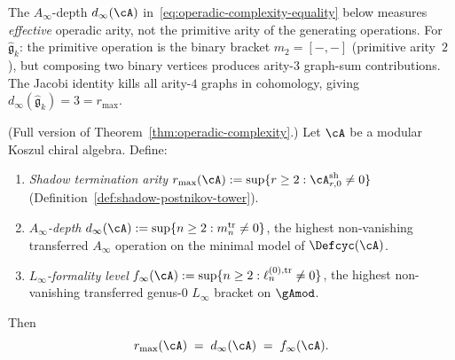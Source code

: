 \begin{remark}
\label{rem:effective-vs-primitive-arity}
The $A_\infty$-depth $d_\infty(\cA)$
in~\eqref{eq:operadic-complexity-equality} below
measures \emph{effective} operadic arity, not the
primitive arity of the generating operations.
For $\hat{\mathfrak{g}}_k$: the primitive operation is
the binary bracket $m_2 = [-,-]$ (primitive arity~$2$),
but composing two binary vertices produces arity-$3$
graph-sum contributions.  The Jacobi identity kills
all arity-$4$ graphs in cohomology, giving
$d_\infty(\hat{\mathfrak{g}}_k) = 3 = r_{\max}$.
\end{remark}

\begin{conjecture}
\label{conj:operadic-complexity-detailed}
\ClaimStatusConjectured
{}
\textup{(}Full version of
Theorem~\textup{\ref{thm:operadic-complexity}}.\textup{)}
Let $\cA$ be a modular Koszul chiral algebra.  Define:
\begin{enumerate}[label=\textup{(\arabic*)}]
\item \emph{Shadow termination arity}\;
  $r_{\max}(\cA) := \sup\{r \geq 2 :
  \cA^{\mathrm{sh}}_{r,0} \neq 0\}$
  \textup{(}Definition~\textup{\ref{def:shadow-postnikov-tower})}.
\item \emph{$A_\infty$-depth}\;
  $d_\infty(\cA) := \sup\{n \geq 2 :
  m_n^{\mathrm{tr}} \neq 0\}$,
  the highest non-vanishing transferred $A_\infty$
  operation on the minimal model of $\Defcyc(\cA)$.
\item \emph{$L_\infty$-formality level}\;
  $f_\infty(\cA) := \sup\{n \geq 2 :
  \ell_n^{(0),\mathrm{tr}} \neq 0\}$,
  the highest non-vanishing transferred genus-$0$
  $L_\infty$ bracket on $\gAmod$.
\end{enumerate}
Then
\begin{equation}
\label{eq:operadic-complexity-equality}
r_{\max}(\cA)
\;=\;
d_\infty(\cA)
\;=\;
f_\infty(\cA).
\end{equation}
\end{conjecture}

